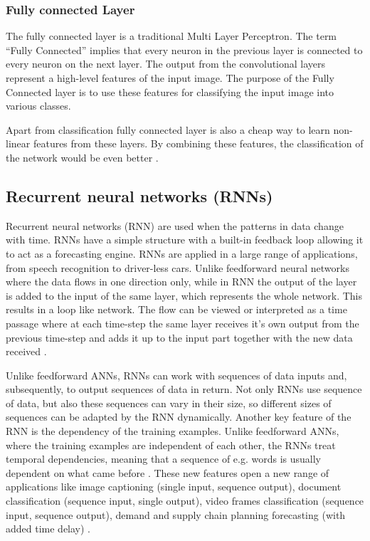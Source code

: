 \subsubsection{Fully connected Layer}
The fully connected layer is a traditional Multi Layer Perceptron. The term “Fully Connected” implies that every neuron in the previous layer is connected to every neuron on the next layer. The output from the convolutional layers represent a high-level features of the input image. The purpose of the Fully Connected layer is to use these features for classifying the input image into various classes. 

Apart from classification fully connected layer is also a cheap way to learn non-linear features from these layers. By combining these features, the classification of the network would be even better \cite{Fully_Connected_Layer}.

\subsection{Recurrent neural networks (RNNs)} \label{RNN}
Recurrent neural networks (RNN) are used when the patterns in data change with time. RNNs have a simple structure with a built-in feedback loop allowing it to act as a forecasting engine. RNNs are applied in a large range of applications, from speech recognition to driver-less cars. Unlike feedforward neural networks where the data flows in one direction only, while in RNN the output of the layer is added to the input of the same layer, which represents the whole network. This results in a loop like network. The flow can be viewed or interpreted as a time passage where at each time-step the same layer receives it's own output from the previous time-step and adds it up to the input part together with the new data received \cite{RNNvideo}. 

Unlike feedforward ANNs, RNNs can work with sequences of data inputs and, subsequently, to output sequences of data in return. Not only RNNs use sequence of data, but also these sequences can vary in their size, so different sizes of sequences can be adapted by the RNN dynamically. Another key feature of the RNN is the dependency of the training examples. Unlike feedforward ANNs, where the training examples are independent of each other, the RNNs treat temporal dependencies, meaning that a sequence of e.g. words is usually dependent on what came before \cite{NeonRNN}. These new features open a new range of applications like image captioning (single input, sequence output), document classification (sequence input, single output), video frames classification (sequence input, sequence output), demand and supply chain planning forecasting (with added time delay) \cite{RNNvideo}.

